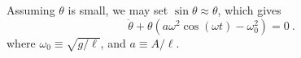\documentclass[11pt,a4paper]{article}
\begin{document}
Assuming $\theta$ is small, we may set $\sin \theta \approx \theta$, which gives
\begin{equation}
\ddot{\theta} +\theta \left( a \omega^2 \cos(\omega t) - \omega_0^2 \right) = 0 ~.
\end{equation}
where $\omega_0 \equiv \sqrt{g/\ell}$, and $a \equiv A/\ell$. 








































































\end{document}
